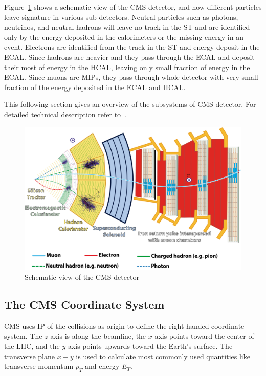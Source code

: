 Figure~\ref{fig:cms-slice} shows a schematic view of the \gls{CMS} detector, and
how different particles leave signature in various sub-detectors.
Neutral particles such as photons, neutrinos, and neutral hadrons will leave no track
in the \gls{ST} and are identified only by the energy deposited
in the calorimeters or the missing energy in an event.
Electrons are identified from the track in the \gls{ST} and energy deposit
in the \gls{ECAL}. Since hadrons are heavier and they pass through the \gls{ECAL}
and deposit their most of energy in the \gls{HCAL}, leaving only small fraction
of energy in the \gls{ECAL}.
Since muons are \glspl{MIP}, they pass through whole detector with very small
fraction of the energy deposited in the \gls{ECAL} and \gls{HCAL}.

This following section gives an overview of the subsystems of \gls{CMS} detector.
For detailed technical description refer to~\cite{CMS-JINST-S08004}.

\begin{figure}[!ht]
  \centering
  \includegraphics[width=\textwidth]{figures/cms_slice.png}
  \caption[Schematic view of the CMS detector]%
  {Schematic view of the CMS detector~\cite{image-cms-slice}}%
  \label{fig:cms-slice}
\end{figure}

\clearpage{}
\subsection{
  The CMS Coordinate System
}\label{ch_cms:cms-coordinate}

CMS uses \gls{IP} of the collisions as origin to define the right-handed
coordinate system. The \( z \)-axis is along the beamline,
the \( x \)-axis points toward the center of the \gls{LHC},
and the \( y \)-axis points upwards toward the Earth's surface.
The transverse plane \( x - y \) is used to calculate
most commonly used quantities like transverse momentum \( p_{T} \)
and energy \( E_{T} \).

